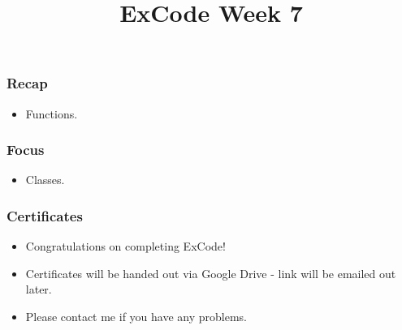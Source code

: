 \documentclass{beamer}
\title{ExCode Week 7}
\institute{University of Exeter}
\date{\displaydate{today}}
\begin{document}
\frame{\titlepage}

\begin{frame}
	\frametitle{Recap}

	\begin{itemize}
		\item{Functions.}
	\end{itemize}
\end{frame}

\begin{frame}
	\frametitle{Focus}
	
	\begin{itemize}
		\item{Classes.}
	\end{itemize}
\end{frame}

\begin{frame}
	\frametitle{Certificates}

	\begin{itemize}
		\item{Congratulations on completing ExCode!}
		\item{Certificates will be handed out via Google Drive - link
			will be emailed out later.}
		\item{Please contact me if you have any problems.}
	\end{itemize}
\end{frame}
\end{document}
